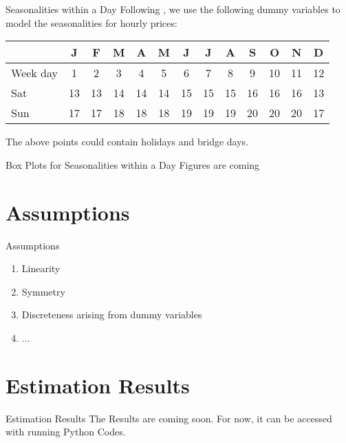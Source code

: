 \documentclass{beamer}
\begin{document}
\begin{frame}{Seasonalities within a Day}
    Following \cite{SteinErikParaschivSchuerle-2013}, we use the following dummy variables to model the seasonalities for hourly prices:

    \footnotesize
    \begin{tabular}{l|cccccccccccc}
         & J  & F  & M  & A  & M  & J  & J  & A  & S  & O  & N  & D
        \\
        \toprule
        Week day
         & 1  & 2  & 3  & 4  & 5  & 6  & 7  & 8  & 9  & 10 & 11 & 12
        \\
        Sat
         & 13 & 13 & 14 & 14 & 14 & 15 & 15 & 15 & 16 & 16 & 16 & 13
        \\
        Sun
         & 17 & 17 & 18 & 18 & 18 & 19 & 19 & 19 & 20 & 20 & 20 & 17
    \end{tabular}

    \vspace*{0.8cm}
    The above points could contain holidays and bridge days.
\end{frame}


\begin{frame}{Box Plots for Seasonalities within a Day}
    Figures are coming
\end{frame}


\section{Assumptions}

\begin{frame}{Assumptions}
    \begin{enumerate}[label=\roman*.]
        \item Linearity
        \item Symmetry
        \item Discreteness arising from dummy variables
        \item ...
    \end{enumerate}
\end{frame}


\section{Estimation Results}

\begin{frame}{Estimation Results}
    The Results are coming soon. For now, it can be accessed with running Python Codes.
\end{frame}
\end{document}
